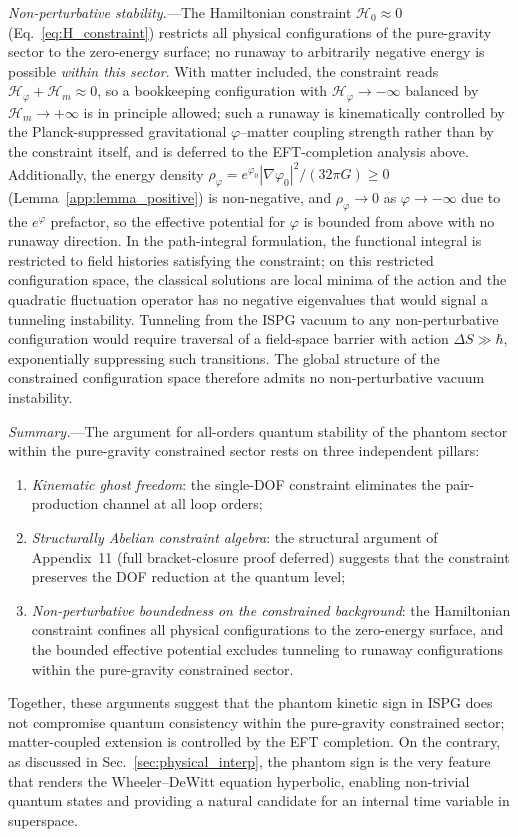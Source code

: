 \documentclass[aps,prd,onecolumn,superscriptaddress,nofootinbib,showpacs,12pt,notitlepage]{revtex4-2}
\begin{document}
\textit{Non-perturbative stability.}---The Hamiltonian
constraint $\mathcal{H}_0 \approx 0$
(Eq.~\ref{eq:H_constraint}) restricts all physical
configurations of the pure-gravity sector to the zero-energy
surface; no runaway to arbitrarily negative energy is possible
\emph{within this sector}. With matter included, the
constraint reads
$\mathcal{H}_\varphi + \mathcal{H}_m \approx 0$, so a
bookkeeping configuration with $\mathcal{H}_\varphi\to -\infty$
balanced by $\mathcal{H}_m\to +\infty$ is in principle allowed;
such a runaway is kinematically controlled by the
Planck-suppressed gravitational $\varphi$--matter coupling
strength rather than by the constraint itself, and is deferred
to the EFT-completion analysis above.  Additionally, the
energy density
$\rho_\varphi = e^{\varphi_0}|\nabla\varphi_0|^2/(32\pi G)
\geq 0$ (Lemma~\ref{app:lemma_positive}) is non-negative,
and $\rho_\varphi \to 0$ as $\varphi \to -\infty$ due to the
$e^{\varphi}$ prefactor, so the effective potential for
$\varphi$ is bounded from above with no runaway direction.
In the path-integral formulation, the functional integral is
restricted to field histories satisfying the constraint; on
this restricted configuration space, the classical solutions
are local minima of the action and the quadratic fluctuation
operator has no negative eigenvalues that would signal a
tunneling instability.  Tunneling from the ISPG vacuum to
any non-perturbative configuration would require traversal
of a field-space barrier with action
$\Delta S \gg \hbar$, exponentially suppressing such
transitions.  The global structure of the constrained
configuration space therefore admits no non-perturbative
vacuum instability.

\textit{Summary.}---The argument for all-orders quantum
stability of the phantom sector within the pure-gravity
constrained sector rests on three independent pillars:
\begin{enumerate}
\item[(i)] \textit{Kinematic ghost freedom}: the single-DOF
  constraint eliminates the pair-production channel at all
  loop orders;
\item[(ii)] \textit{Structurally Abelian constraint algebra}:
  the structural argument of Appendix~11 (full bracket-closure
  proof deferred) suggests that the constraint preserves the
  DOF reduction at the quantum level;
\item[(iii)] \textit{Non-perturbative boundedness on the
  constrained background}: the Hamiltonian constraint confines
  all physical configurations to the zero-energy surface, and
  the bounded effective potential excludes tunneling to runaway
  configurations within the pure-gravity constrained sector.
\end{enumerate}
Together, these arguments suggest that the phantom kinetic sign
in ISPG does not compromise quantum consistency within the
pure-gravity constrained sector; matter-coupled extension is
controlled by the EFT completion. On the contrary, as discussed
in Sec.~\ref{sec:physical_interp}, the phantom sign is the very
feature that renders the Wheeler--DeWitt equation hyperbolic,
enabling non-trivial quantum states and providing a natural
candidate for an internal time variable in superspace.
\end{document}
